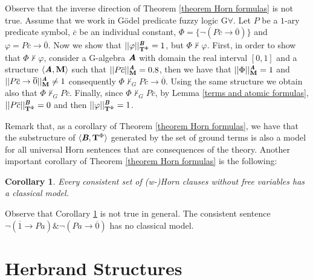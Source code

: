 \documentclass{IOS-Book-Article}
\newtheorem{corollary}{Corollary}
\begin{document}
\bigskip


Observe that the inverse direction of Theorem \ref{theorem Horn formulas} is not true. Assume that we work in G\"odel predicate fuzzy logic G$\forall$. Let $P$ be a $1$-ary predicate symbol, $\overline{c}$ be an individual constant, $\Phi=\{\neg(P\overline{c}\rightarrow\overline{0})\}$ and $\varphi=P\overline{c}\rightarrow\overline{0}$. Now we show that $|| \varphi||^{\emph{\textbf{B}}}_{\mathrm{\mathbf{T}}^{\Phi}}=1$, but $\Phi\not \vdash\varphi$. First, in order to show that $\Phi\not \vdash\varphi$, consider a G-algebra $\emph{\textbf{A}}$ with domain the real interval $[0,1]$ and a structure $\langle\emph{\textbf{A}},\mathrm{\mathbf{M}}\rangle$ such that $||P\overline{c}||^{\emph{\textbf{A}}}_{\mathrm{\mathbf{M}}}=0.8$, then we have that $||\Phi||^{\emph{\textbf{A}}}_{\mathrm{\mathbf{M}}}=1$ and $||P\overline{c}\to \overline{0}||^{\emph{\textbf{A}}}_{\mathrm{\mathbf{M}}}\neq1$ consequently $\Phi\not\vdash_GP\overline{c}\to \overline{0}$. Using the same structure we obtain also that $\Phi\not\vdash_GP\overline{c}$. Finally, since $\Phi\not\vdash_GP\overline{c}$, by Lemma \ref{terms and atomic formulas}, $||P\overline{c}||^{\emph{\textbf{B}}}_{\mathrm{\mathbf{T}}^{\Phi}}=0$ and then $||\varphi||^{\emph{\textbf{B}}}_{\mathrm{\mathbf{T}}^{\Phi}}=1$.

\bigskip
Remark that, as a corollary of Theorem \ref{theorem Horn formulas}, we have that the substructure of $\langle\emph{\textbf{B}},\mathrm{\mathbf{T}}^{\Phi}\rangle$ generated by the set of ground terms is also a model for all universal Horn sentences that are consequences of the theory. Another important corollary of Theorem \ref{theorem Horn formulas} is the following:

\begin{corollary} \label{classic} Every consistent set of (w-)Horn clauses without free variables has a classical model.
\end{corollary}

Observe that Corollary \ref{classic} is not true in general. The consistent sentence $\neg (\overline{1} \to Pa) \& \neg (Pa \to \overline{0})$ has no classical model. 


\section{Herbrand Structures}
\label{Herbrand Structures}
\end{document}
